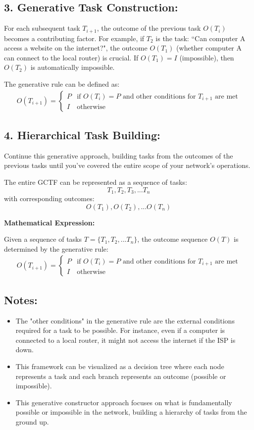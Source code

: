 \documentclass[sn-nature]{sn-jnl}%
\newcommand{\sbt}{\,\begin{picture}(-1,1)(-1,-3)\circle*{3}\end{picture}\ }
\theoremstyle{thmstyleone}%
\theoremstyle{thmstyletwo}%
\theoremstyle{thmstylethree}%
\begin{document}
\subsection*{3. Generative Task Construction:}
For each subsequent task $T_{i+1}$, the outcome of the previous task $O(T_i)$ becomes a contributing factor. 
For example, if $T_2$ is the task: ``Can computer A access a website on the internet?", the outcome $O(T_1)$ (whether computer A can connect to the local router) is crucial. If $O(T_1) = I$ (impossible), then $O(T_2)$ is automatically impossible.

The generative rule can be defined as:
\begin{align*}
O(T_{i+1}) = 
  \begin{cases} 
    P & \text{if } O(T_i) = P \text{ and other conditions for } T_{i+1} \text{ are met} \\
    I & \text{otherwise}
  \end{cases}
\end{align*}

\subsection*{4. Hierarchical Task Building:}
Continue this generative approach, building tasks from the outcomes of the previous tasks until you've covered the entire scope of your network's operations.

The entire GCTF can be represented as a sequence of tasks:
\[ T_1, T_2, T_3, ... T_n \]
with corresponding outcomes:
\[ O(T_1), O(T_2), ... O(T_n) \]

\textbf{Mathematical Expression:}

Given a sequence of tasks $T = \{T_1, T_2, ... T_n\}$, the outcome sequence $O(T)$ is determined by the generative rule:
\begin{align*}
O(T_{i+1}) = 
  \begin{cases} 
    P & \text{if } O(T_i) = P \text{ and other conditions for } T_{i+1} \text{ are met} \\
    I & \text{otherwise}
  \end{cases}
\end{align*}

\subsection*{Notes:}
\begin{itemize}
    \item[\sbt] The "other conditions" in the generative rule are the external conditions required for a task to be possible. For instance, even if a computer is connected to a local router, it might not access the internet if the ISP is down.
    \item[\sbt] This framework can be visualized as a decision tree where each node represents a task and each branch represents an outcome (possible or impossible).
    \item[\sbt] This generative constructor approach focuses on what is fundamentally possible or impossible in the network, building a hierarchy of tasks from the ground up.
\end{itemize}
\end{document}

